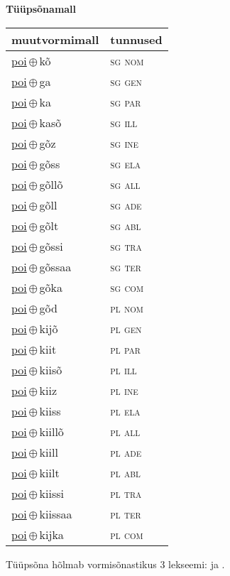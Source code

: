

\vspace{3.5em}
\noindent \begin{minipage}{\textwidth}
\noindent \textbf{Tüüpsõnamall \,}\\

\begin{sideways}
\begin{tabular}{l l}
muutvormimall & tunnused \\
\hline
\underline{poi}\,$\oplus$\,kõ & \textsc{ sg nom } \\
\underline{poi}\,$\oplus$\,ga & \textsc{ sg gen } \\
\underline{poi}\,$\oplus$\,ka & \textsc{ sg par } \\
\underline{poi}\,$\oplus$\,kasõ & \textsc{ sg ill } \\
\underline{poi}\,$\oplus$\,gõz & \textsc{ sg ine } \\
\underline{poi}\,$\oplus$\,gõss & \textsc{ sg ela } \\
\underline{poi}\,$\oplus$\,gõllõ & \textsc{ sg all } \\
\underline{poi}\,$\oplus$\,gõll & \textsc{ sg ade } \\
\underline{poi}\,$\oplus$\,gõlt & \textsc{ sg abl } \\
\underline{poi}\,$\oplus$\,gõssi & \textsc{ sg tra } \\
\underline{poi}\,$\oplus$\,gõssaa & \textsc{ sg ter } \\
\underline{poi}\,$\oplus$\,gõka & \textsc{ sg com } \\
\underline{poi}\,$\oplus$\,gõd & \textsc{ pl nom } \\
\underline{poi}\,$\oplus$\,kijõ & \textsc{ pl gen } \\
\underline{poi}\,$\oplus$\,kiit & \textsc{ pl par } \\
\underline{poi}\,$\oplus$\,kiisõ & \textsc{ pl ill } \\
\underline{poi}\,$\oplus$\,kiiz & \textsc{ pl ine } \\
\underline{poi}\,$\oplus$\,kiiss & \textsc{ pl ela } \\
\underline{poi}\,$\oplus$\,kiillõ & \textsc{ pl all } \\
\underline{poi}\,$\oplus$\,kiill & \textsc{ pl ade } \\
\underline{poi}\,$\oplus$\,kiilt & \textsc{ pl abl } \\
\underline{poi}\,$\oplus$\,kiissi & \textsc{ pl tra } \\
\underline{poi}\,$\oplus$\,kiissaa & \textsc{ pl ter } \\
\underline{poi}\,$\oplus$\,kijka & \textsc{ pl com } \\
\end{tabular}
\end{sideways}
\label{tab:tüüpsõnamall-poikõ}

\end{minipage}

 
\vspace{1em}
\noindent Tüüpsõna hõlmab vormisõnastikus 3 lekseemi:  ja .
